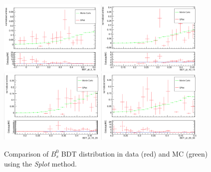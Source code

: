 \begin{figure}[h]
\begin{center}
\includegraphics[width=0.45\textwidth]{Figures/Chapter5/Bs_BDT_5_10.png}
\includegraphics[width=0.45\textwidth]{Figures/Chapter5/Bs_BDT_10_15.png}
\includegraphics[width=0.45\textwidth]{Figures/Chapter5/Bs_BDT_15_20.png}
\includegraphics[width=0.45\textwidth]{Figures/Chapter5/Bs_BDT_20_50.png}
\caption{Comparison of $B^0_s$ BDT distribution in data (red) and MC (green) using the \textit{Splot} method.}
\label{BsMCData}
\end{center}
\end{figure}

